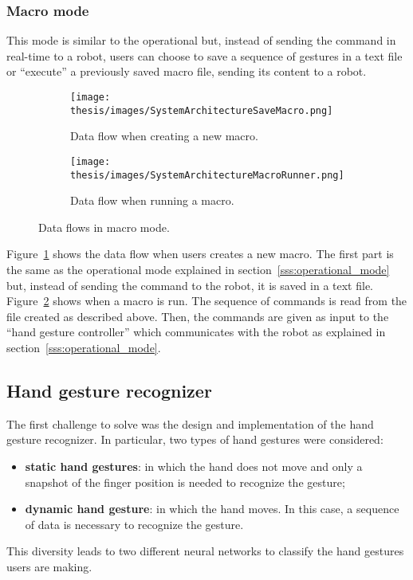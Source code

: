 \documentclass[../thesis.tex]{subfiles}
\begin{document}
\subsubsection{Macro mode}
This mode is similar to the operational but, instead of sending the command in real-time to a robot, users can choose to save a sequence of gestures in a text file or ``execute'' a previously saved macro file, sending its content to a robot. 
\begin{figure}[H]
    \centering
    \begin{subfigure}[b]{\textwidth}
        \texttt{[image: thesis/images/SystemArchitectureSaveMacro.png]}
        \caption{Data flow when creating a new macro.}
        \label{fig:system_architecture_save_macro}
    \end{subfigure}
    \hfill
    \begin{subfigure}[b]{0.7\textwidth}
        \texttt{[image: thesis/images/SystemArchitectureMacroRunner.png]}
        \caption{Data flow when running a macro.}
        \label{fig:system_architecture_run_macro}
    \end{subfigure}
    
    \caption{Data flows in macro mode.}
    \label{fig:macro_data_flows}
\end{figure}
Figure~\ref{fig:system_architecture_save_macro} shows the data flow when users creates a new macro. The first part is the same as the operational mode explained in section~\ref{sss:operational_mode} but, instead of sending the command to the robot, it is saved in a text file. Figure~\ref{fig:system_architecture_run_macro} shows when a macro is run. The sequence of commands is read from the file created as described above. Then, the commands are given as input to the ``hand gesture controller'' which communicates with the robot as explained in section~\ref{sss:operational_mode}.

\subsection{Hand gesture recognizer}
The first challenge to solve was the design and implementation of the hand gesture recognizer. In particular, two types of hand gestures were considered: 
\begin{itemize}
    \item \textbf{static hand gestures}: in which the hand does not move and only a snapshot of the finger position is needed to recognize the gesture;
    \item \textbf{dynamic hand gesture}: in which the hand moves. In this case, a sequence of data is necessary to recognize the gesture. 
\end{itemize}
This diversity leads to two different neural networks to classify the hand gestures users are making. 
\end{document}
